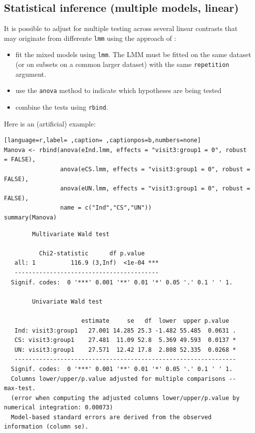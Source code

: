 \documentclass[12pt]{article}
\begin{document}
\clearpage

\subsection{Statistical inference (multiple models, linear)}
\label{sec:orge011d31}

It is possible to adjust for multiple testing across several linear
contrasts that may originate from differente \texttt{lmm} using the approach
of \cite{pipper2012versatile}:
\begin{itemize}
\item fit the mixed models using \texttt{lmm}. The LMM must be fitted on the same
dataset (or on subsets on a common larger dataset) with the same \texttt{repetition} argument.
\item use the \texttt{anova} method to indicate which hypotheses are being tested
\item combine the tests using \texttt{rbind}.
\end{itemize}

Here is an (artificial) example:
\begin{lstlisting}[language=r,label= ,caption= ,captionpos=b,numbers=none]
Manova <- rbind(anova(eInd.lmm, effects = "visit3:group1 = 0", robust = FALSE),
                anova(eCS.lmm, effects = "visit3:group1 = 0", robust = FALSE),
                anova(eUN.lmm, effects = "visit3:group1 = 0", robust = FALSE),
                name = c("Ind","CS","UN"))
summary(Manova) 
\end{lstlisting}

\begin{verbatim}
		Multivariate Wald test 

          Chi2-statistic      df p.value    
   all: 1          116.9 (3,Inf)  <1e-04 ***
   ----------------------------------------- 
  Signif. codes:  0 '***' 0.001 '**' 0.01 '*' 0.05 '.' 0.1 ' ' 1.

		Univariate Wald test 

                      estimate     se   df  lower  upper p.value  
   Ind: visit3:group1   27.001 14.285 25.3 -1.482 55.485  0.0631 .
   CS: visit3:group1    27.481  11.09 52.8  5.369 49.593  0.0137 *
   UN: visit3:group1    27.571  12.42 17.8  2.808 52.335  0.0268 *
   --------------------------------------------------------------- 
  Signif. codes:  0 '***' 0.001 '**' 0.01 '*' 0.05 '.' 0.1 ' ' 1.
  Columns lower/upper/p.value adjusted for multiple comparisons -- max-test.
  (error when computing the adjusted columns lower/upper/p.value by numerical integration: 0.00073)
  Model-based standard errors are derived from the observed information (column se).
\end{verbatim}
\end{document}
